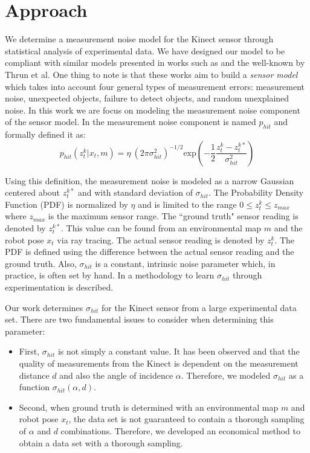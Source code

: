 \section{Approach} \label{sec:approach}

We determine a measurement noise
model for the Kinect sensor through statistical analysis of experimental data.
We have designed our model to be compliant with similar models presented in works such  as \cite{Elfes1989} and the well-known
\cite{Thrun:2005:PR:1121596} by Thrun et al. One thing to note is that these
works aim to build a \emph{sensor model} which takes into account four general
types of measurement errors: measurement noise, unexpected objects, failure to
detect objects, and random unexplained noise. In this work we are focus on modeling the
measurement noise component of the sensor model. In \cite{Thrun:2005:PR:1121596} the measurement
noise component is named $p_{hit}$ and formally defined it as: 
%
{
\setlength\abovedisplayskip{7pt} \setlength\belowdisplayskip{2pt}%
\begin{equation*}
p_{hit}(z_t^k|x_t,m) = \eta \  \left(2\pi\sigma^2_{hit}\right)^{-1/2} \text{exp}\left(-\frac{1}{2}\frac{z_t^k-z_t^{k*}}{\sigma^2_{hit}}\right)
\label{eq:mp} 
\end{equation*}
}
%

\noindent Using this definition, the measurement noise is modeled as a narrow Gaussian centered about $z_t^{k*}$ and with standard deviation of $\sigma_{hit}$. The Probability Density Function (PDF) is normalized by $\eta$ and is limited to the range $0\leq z_t^k\leq z_{max}$ where $z_{max}$ is the maximum sensor range.  The ``ground truth" sensor reading is denoted by $z_t^{k*}$. This value can be found from an environmental map $m$ and the robot pose $x_t$ via ray tracing. The actual sensor reading is denoted by $z_t^k$. The PDF is defined using the difference between the actual sensor reading and the ground truth. Also, $\sigma_{hit}$ is a constant, intrinsic noise parameter which, in practice, is often set by hand. In \cite{Thrun:2005:PR:1121596} a methodology to learn $\sigma_{hit}$ through experimentation is described. 

Our work determines $\sigma_{hit}$ for the Kinect sensor from a large experimental data set. There are two fundamental issues to consider when determining this parameter:  

\begin{itemize}
\item  First, $\sigma_{hit}$ is not simply a constant value. It has been observed \cite{Fallon2012} and \cite{Newcombe2011} that the quality of measurements from the Kinect is dependent on the measurement distance $d$ and also the angle of incidence $\alpha$. Therefore, we modeled $\sigma_{hit}$ as a function $\sigma_{hit}(\alpha,d)$. 
\item Second, when ground truth is determined with an environmental map $m$ and robot pose $x_t$, the data set is not guaranteed to contain a thorough sampling of $\alpha$ and $d$ combinations. Therefore, we developed an economical method to obtain a data set with a thorough sampling. 
\end{itemize}

